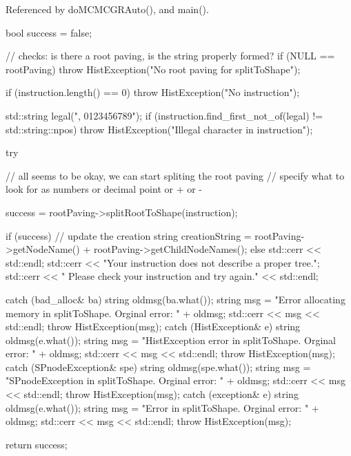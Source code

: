 \-Referenced by do\-M\-C\-M\-C\-G\-R\-Auto(), and main().


\begin{DoxyCode}
{
    bool success = false;

    // checks:  is there a root paving, is the string properly formed?
    if (NULL == rootPaving) {
        throw HistException("No root paving for splitToShape");
    }

   if (instruction.length() == 0) {
      throw HistException("No instruction");
    }

    std::string legal(", 0123456789");
    if (instruction.find_first_not_of(legal) != std::string::npos) {
        throw HistException("Illegal character in instruction");
    }

    try { // all seems to be okay, we can start spliting the root paving
        // specify what to look for as numbers or decimal point or + or -

       success = rootPaving->splitRootToShape(instruction);

        if (success) {
            // update the creation string
            creationString = rootPaving->getNodeName()
                + rootPaving->getChildNodeNames();
        }
        else {
            std::cerr << std::endl;
            std::cerr << "Your instruction does not describe a proper tree.";
            std::cerr << "  Please check your instruction and try again."
            << std::endl;
       }
    }

    catch (bad_alloc& ba) {
        string oldmsg(ba.what());
        string msg = "Error allocating memory in splitToShape.  Orginal error: 
      "
                                            + oldmsg;
        std::cerr << msg << std::endl;
        throw HistException(msg);
    }
    catch (HistException& e) {
        string oldmsg(e.what());
        string msg = "HistException error in splitToShape.  Orginal error: "
                                    + oldmsg;
        std::cerr << msg << std::endl;
        throw HistException(msg);
    }
    catch (SPnodeException& spe) {
        string oldmsg(spe.what());
        string msg = "SPnodeException in splitToShape.  Orginal error: " + 
      oldmsg;
        std::cerr << msg << std::endl;
        throw HistException(msg);
    }
    catch (exception& e) {
        string oldmsg(e.what());
        string msg = "Error in splitToShape.  Orginal error: " + oldmsg;
        std::cerr << msg << std::endl;
        throw HistException(msg);
    }

    return success;
}
\end{DoxyCode}
